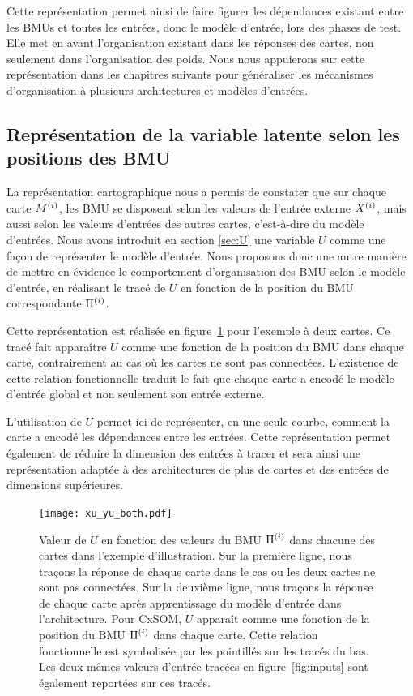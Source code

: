 \documentclass[../main]{subfiles}
\begin{document}
Cette représentation permet ainsi de faire figurer les dépendances existant entre les BMUs et toutes les entrées, donc le modèle d'entrée, lors des phases de test. Elle met en avant l'organisation existant dans les réponses des cartes, non seulement dans l'organisation des poids.
Nous nous appuierons sur cette représentation dans les chapitres suivants pour généraliser les mécanismes d'organisation à plusieurs architectures et modèles d'entrées.

\subsection{Représentation de la variable latente selon les positions des BMU}\label{sec:u_bmu}

La représentation cartographique nous a permis de constater que sur chaque carte $M^{({i})}$, les BMU se disposent selon les valeurs de l'entrée externe $X^{({i})}$, mais aussi selon les valeurs d'entrées des autres cartes, c'est-à-dire du modèle d'entrées.
Nous avons introduit en section \ref{sec:U} une variable $U$ comme une façon de représenter le modèle d'entrée. 
Nous proposons donc une autre manière de mettre en évidence le comportement d'organisation des BMU selon le modèle d'entrée, en réalisant le tracé de $U$ en fonction de la position du BMU correspondante $\Pi^{({i})}$.

Cette représentation est réalisée en figure~\ref{fig:piu} pour l'exemple à deux cartes.
Ce tracé fait apparaître $U$ comme une fonction de la position du BMU dans chaque carte, contrairement au cas où les cartes ne sont pas connectées. 
L'existence de cette relation fonctionnelle traduit le fait que chaque carte a encodé le modèle d'entrée global et non seulement son entrée externe.

L'utilisation de $U$ permet ici de représenter, en une seule courbe, comment la carte a encodé les dépendances entre les entrées.
Cette représentation permet également de réduire la dimension des entrées à tracer et sera ainsi une représentation adaptée à des architectures de plus de cartes et des entrées de dimensions supérieures.

\begin{figure}
\centering
\texttt{[image: xu\_yu\_both.pdf]}
\caption{Valeur de $U$ en fonction des valeurs du BMU $\Pi^{({i})}$ dans chacune des cartes dans l'exemple d'illustration. Sur la première ligne, nous traçons la réponse de chaque carte dans le cas ou les deux cartes ne sont pas connectées. Sur la deuxième ligne, nous traçons la réponse de chaque carte après apprentissage du modèle d'entrée dans l'architecture.
Pour CxSOM, $U$ apparaît comme une fonction de la position du BMU $\Pi^{({i})}$ dans chaque carte. Cette relation fonctionnelle est symbolisée par les pointillés sur les tracés du bas.
Les deux mêmes valeurs d'entrée tracées en figure~\ref{fig:inputs} sont également reportées sur ces tracés.
\label{fig:piu}}
\end{figure}
\end{document}
